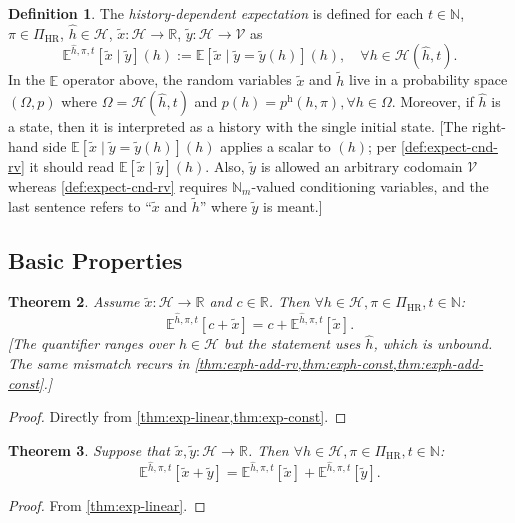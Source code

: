 \documentclass[letterpaper]{article}
\theoremstyle{plain}
\newtheorem{theorem}{Theorem}[subsection]
\theoremstyle{definition}
\newtheorem{definition}[theorem]{Definition}
\theoremstyle{remark}
\newcommand{\Nats}{\mathbb{N}}
\newcommand{\Real}{\mathbb{R}}
\newcommand{\E}{\mathbb{E}}
\newcommand{\PiHR}{\Pi_{\mathrm{HR}}}
\newcommand{\cc}[1]{\textcolor{ccolor}{[#1]}}
\newcommand{\lean}[1]{\textcolor{blue}{(\emph{LEAN}: \texttt{#1})}}
\newcommand{\leanok}{}
\begin{document}
\begin{definition}\label{def:expect-h-cnd-rv}
The \emph{history-dependent expectation} is defined for each $t\in \Nats$, $\pi\in \PiHR$, $\hat{h}\in \mathcal{H}$, $\tilde{x}\colon \mathcal{H} \to \Real$, $\tilde{y}\colon \mathcal{H} \to \mathcal{\mathcal{V}}$ as
\begin{equation*}
\E^{\hat{h}, \pi, t} [\tilde{x} \mid \tilde{y} ](h)
:= \E \left[ \tilde{x} \mid \tilde{y} = \tilde{y}(h) \right](h), \quad\forall h\in \mathcal{H}(\hat{h}, t).
\end{equation*}
In the $\E$ operator above, the random variables $\tilde{x}$ and $\tilde{h}$ live in a probability space $(\Omega, p)$ where $\Omega = \mathcal{H}(\hat{h}, t)$ and $p(h) = p^{\mathrm{h}}(h, \pi), \forall h\in \Omega$.
Moreover, if $\hat{h}$ is a state, then it is interpreted as a history with the single initial state.
\cc{The right-hand side $\E[\tilde{x}\mid \tilde{y}=\tilde{y}(h)](h)$ applies a scalar to $(h)$; per \cref{def:expect-cnd-rv} it should read $\E[\tilde{x}\mid\tilde{y}](h)$. Also, $\tilde{y}$ is allowed an arbitrary codomain $\mathcal{V}$ whereas \cref{def:expect-cnd-rv} requires $\Nats_m$-valued conditioning variables, and the last sentence refers to ``$\tilde{x}$ and $\tilde{h}$'' where $\tilde{y}$ is meant.}
\end{definition}


\subsection{Basic Properties}


\begin{theorem} \label{thm:exph-congr}
Assume $\tilde{x} \colon \mathcal{H} \to \Real$ and $c \in \Real$. Then $\forall h\in \mathcal{H}, \pi\in \PiHR, t \in \Nats$:
\[
  \E^{\hat{h}, \pi, t} \left[ c + \tilde{x} \right]
  =
  c + \E^{\hat{h}, \pi, t} \left[ \tilde{x} \right].
\]
\cc{The quantifier ranges over $h\in \mathcal{H}$ but the statement uses $\hat{h}$, which is unbound. The same mismatch recurs in \cref{thm:exph-add-rv,thm:exph-const,thm:exph-add-const}.}
\end{theorem}
\begin{proof}
Directly from \cref{thm:exp-linear,thm:exp-const}.
\end{proof}

\begin{theorem} \label{thm:exph-add-rv}
Suppose that $\tilde{x}, \tilde{y} \colon \mathcal{H} \to \Real $. Then $\forall h\in \mathcal{H}, \pi\in \PiHR, t \in \Nats$:
\[
  \E^{\hat{h}, \pi, t} \left[ \tilde{x} + \tilde{y} \right]
  =
  \E^{\hat{h}, \pi, t} \left[ \tilde{x} \right] + \E^{\hat{h}, \pi, t} \left[ \tilde{y} \right].
\]
\end{theorem}
\begin{proof}
  From \cref{thm:exp-linear}.
\end{proof}
\end{document}
